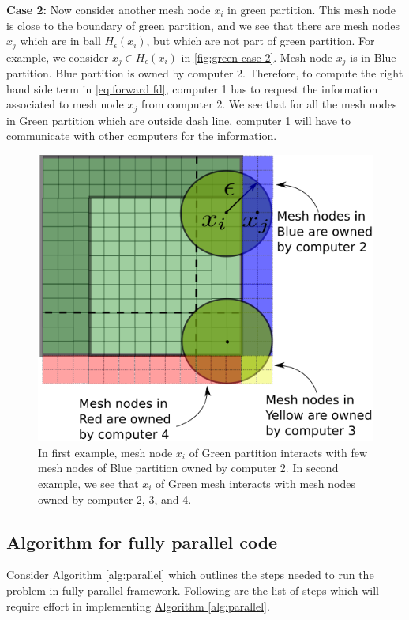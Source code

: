 \documentclass[11pt,twocolumn]{amsart}
\theoremstyle{definition}
\theoremstyle{definition}
\numberwithin{equation}{section}
\numberwithin{equation}{section}
\newcommand{\sref}[2]{\hyperref[#2]{#1 \ref*{#2}}}
\begin{document}
\textbf{Case 2: }Now consider another mesh node $x_i$ in green partition. This mesh node is close to the boundary of green partition, and we see that there are mesh nodes $x_j$ which are in ball $H_\epsilon(x_i)$, but which are not part of green partition. For example, we consider $x_j \in H_\epsilon(x_i)$ in \autoref{fig:green case 2}. Mesh node $x_j$ is in Blue partition. Blue partition is owned by computer 2. Therefore, to compute the right hand side term in \autoref{eq:forward fd}, computer 1 has to request the information associated to mesh node $x_j$ from computer 2. We see that for all the mesh nodes in Green partition which are outside dash line, computer 1 will have to communicate with other computers for the information. 

\begin{figure}[ht]
\centering
\includegraphics[scale=0.5]{mesh_partition_green_case_2.png}
\caption{In first example, mesh node $x_i$ of Green partition interacts with few mesh nodes of Blue partition owned by computer 2. In second example, we see that $x_i$ of Green mesh interacts with mesh nodes owned by computer 2, 3, and 4.}\label{fig:green case 2}
\end{figure}

\subsection{Algorithm for fully parallel code}
Consider \sref{Algorithm}{alg:parallel} which outlines the steps needed to run the problem in fully parallel framework. Following are the list of steps which will require effort in implementing \sref{Algorithm}{alg:parallel}.
\end{document}
